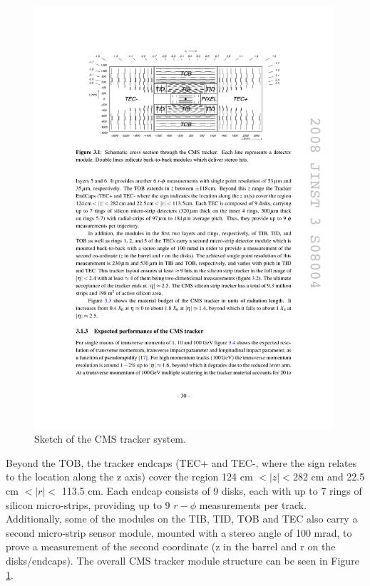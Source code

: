 \begin{figure}[h]
\centering 
\includegraphics[width=0.99\textwidth]{figures/cms_tracker}\hfil
\caption{Sketch of the CMS tracker system. }
\label{fig:cms_tracker}
\end{figure}


Beyond the TOB, the tracker endcaps (TEC+ and TEC-, where the sign relates to the location along the z axis) cover the region 124 cm $< |z| < $282 cm and 22.5 cm $< |r| <$ 113.5 cm. 
Each endcap consists of 9 disks, each with up to 7 rings of silicon micro-strips, providing up to 9 $r-\phi$ measurements per track. 
Additionally, some of the modules on the TIB, TID, TOB and TEC also carry a second micro-strip sensor module, mounted with a stereo angle of 100 mrad, to prove a measurement of the second coordinate (z in the barrel and r on the disks/endcaps). 
The overall CMS tracker module structure can be seen in Figure \ref{fig:cms_tracker}.


